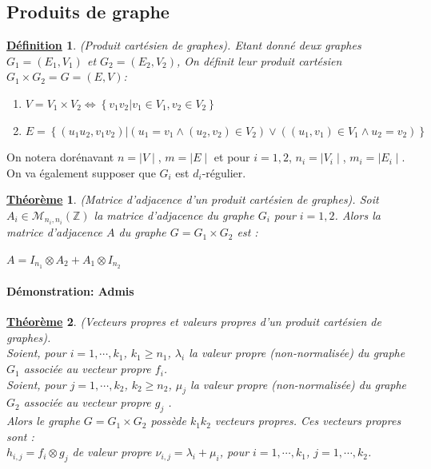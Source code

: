 \documentclass[12pt,openany]{report}
\newtheorem{theorem}{\underline{Théorème}}
\newtheorem{definition}{\underline{Définition}}
\begin{document}
\subsection{Produits de graphe}
\begin{definition}(Produit cartésien de graphes). Etant donné deux graphes $ \mathit{G}_{1}=(E_1, V_1)$ et $\mathit{G}_2 = (E_2, V_2)$, On définit leur produit cartésien $ \mathit{G}_1 \times \mathit{G}_2=\mathit{G}=(E,V)$:
\begin{enumerate}
\item $\mathit{V}=\mathit{V}_1 \times \mathit{V}_2 \Leftrightarrow\left\lbrace v_1 v_2 | v_1 \in \mathit{V}_1 , v_2 \in \mathit{V}_2 \right\rbrace     $
\item $\mathit{E}=\left\lbrace \left( u_1u_2,v_1v_2 \right) |\left( u_1=v_1\wedge(u_2,v_2) \in \mathit{V}_2 \right)\vee \left( (u_1,v_1) \in \mathit{V}_1 \wedge u_2=v_2 \right)   \right\rbrace      $
\end{enumerate}

\end{definition}

On notera dorénavant $n=\mid \mathit{V} \mid $, $m=\mid \mathit{E}\mid $ et pour  $i=1,2$, $n_i=\mid \mathit{V}_i \mid  $, $m_i=\mid \mathit{E}_i\mid $.\\
On va également supposer que  $\mathit{G}_i $ est $d_i$-régulier.

\begin{theorem}  (Matrice d’adjacence d’un produit cartésien de graphes).
Soit $\mathit{A}_i \in \mathcal{M}_{n_i,n_i}(\mathbb{Z})$ la matrice d'adjacence du graphe $ \mathit{G}_i $ pour $i=1,2$. Alors la matrice d'adjacence $ \mathit{A}  $ du graphe $ \mathit{G}=\mathit{G}_1 \times \mathit{G}_2$ est :
\begin{center}
$ \mathit{A}= \mathit{I}_{n_1} \otimes \mathit{A}_2 + \mathit{A}_1 \otimes \mathit{I}_{n_2} $
\end{center}

\end{theorem}
\paragraph{Démonstration: Admis }
\begin{theorem} (Vecteurs propres et valeurs propres d’un produit cartésien
de graphes)\cite{Ghazal}.\\ Soient, pour $i = 1,\cdots, k_1$, $k_1\geq n_1$, $\lambda_i$
la valeur propre (non-normalisée) du graphe $\mathit{G}_1$ associée au vecteur propre $f_i$.\\

Soient, pour $j = 1,\cdots, k_2$, $k_2 \geq n_2$, $\mu_j$ la valeur propre (non-normalisée) du graphe $\mathit{G}_2$ associée au vecteur propre $g_j$ .\\

Alors le graphe $G = G_1\times G_2$ possède $k_1k_2$ vecteurs propres. Ces vecteurs propres sont :\\
$h_{i,j}=f_i \otimes g_j $ de valeur propre $ \nu_{i,j}=\lambda_i + \mu_i $, pour $i=1,\cdots,k_1  $, $ j=1,\cdots,k_2 $.

\end{theorem}
\end{document}
